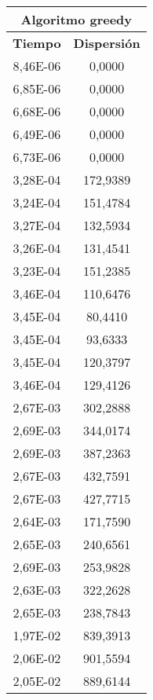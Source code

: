 \begin{figure}[h]
\begin{minipage}[l]{0.32\textwidth}
\begin{tabular}{|c|c|}
	        \hline
	    \end{tabular}
	\end{minipage}
	\begin{minipage}[c]{0.32\textwidth}
	    \begin{tabular}{|c|c|}
	        \hline
	        \multicolumn{2}{|c|}{\textbf{Algoritmo greedy}} \\
	        \hline
	        \textbf{Tiempo} & \textbf{Dispersión} \\
	        \hline
	        8,46E-06 &  0,0000\\ 
            6,85E-06 &  0,0000\\ 
            6,68E-06 &  0,0000\\ 
            6,49E-06 &  0,0000\\ 
            6,73E-06 &  0,0000\\ 
            3,28E-04 &  172,9389\\ 
            3,24E-04 &  151,4784\\ 
            3,27E-04 &  132,5934\\ 
            3,26E-04 &  131,4541\\ 
            3,23E-04 &  151,2385\\ 
            3,46E-04 &  110,6476\\ 
            3,45E-04 &  80,4410\\ 
            3,45E-04 &  93,6333\\ 
            3,45E-04 &  120,3797\\ 
            3,46E-04 &  129,4126\\ 
            2,67E-03 &  302,2888\\ 
            2,69E-03 &  344,0174\\ 
            2,69E-03 &  387,2363\\ 
            2,67E-03 &  432,7591\\ 
            2,67E-03 &  427,7715\\ 
            2,64E-03 &  171,7590\\ 
            2,65E-03 &  240,6561\\ 
            2,69E-03 &  253,9828\\ 
            2,63E-03 &  322,2628\\ 
            2,65E-03 &  238,7843\\ 
            1,97E-02 &  839,3913\\ 
            2,06E-02 &  901,5594\\ 
            2,05E-02 &  889,6144\\ 

\end{tabular}
\end{minipage}
\end{figure}
